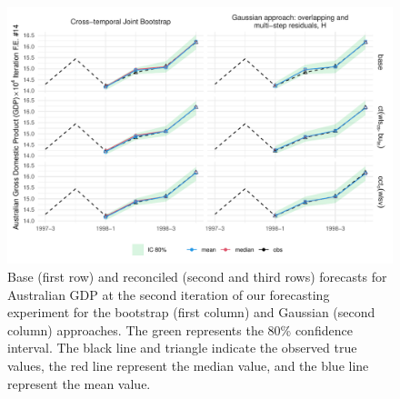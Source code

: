 \documentclass[a4paper,11pt]{article}
\theoremstyle{definition}
\begin{document}
\begin{figure}[t]
	\centering
	\includegraphics[width = 1\linewidth]{fig/AusGDP/gdptrace14.pdf}
	\caption{Base (first row) and reconciled (second and third rows) forecasts for Australian GDP at the second iteration of our forecasting experiment for the bootstrap (first column) and Gaussian (second column) approaches. The green represents the 80\% confidence interval. The black line and triangle indicate the observed true values, the red line represent the median value, and the blue line represent the mean value.}
	\label{fig:gdptrace}
\end{figure}
\end{document}
